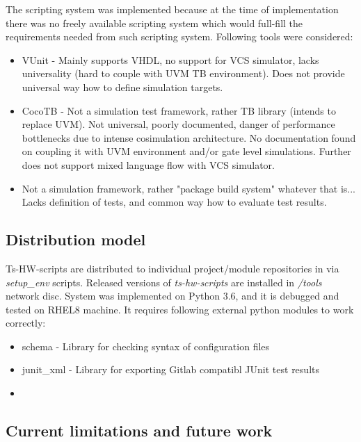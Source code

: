 \documentclass{tropic_design_spec}
\begin{document}
The scripting system was implemented because at the time of implementation there
was no freely available scripting system which would full-fill the requirements
needed from such scripting system. Following tools were considered:
\begin{itemize}
    \item{VUnit - Mainly supports VHDL, no support for VCS simulator, lacks
          universality (hard to couple with UVM TB environment). Does not
          provide universal way how to define simulation targets.}
    \item{CocoTB - Not a simulation test framework, rather TB library
          (intends to replace UVM). Not universal, poorly documented, danger
          of performance bottlenecks due to intense cosimulation architecture.
          No documentation found on coupling it with UVM environment and/or
          gate level simulations. Further does not support mixed language
          flow with VCS simulator.}
    \item{Not a simulation framework, rather "package build system" whatever
          that is... Lacks definition of tests, and common way how to evaluate
          test results.}

\end{itemize}


\subsection*{Distribution model}

Ts-HW-scripts are distributed to individual project/module repositories in
via \textit{setup_env} scripts. Released versions of \textit{ts-hw-scripts}
are installed in \textit{/tools} network disc. System was implemented on Python
3.6, and it is debugged and tested on RHEL8 machine. It requires following
external python modules to work correctly:
\begin{itemize}
    \item{schema - Library for checking syntax of configuration files}
    \item{junit_xml - Library for exporting Gitlab compatibl JUnit test results}
    \item{}
\end{itemize}


\subsection*{Current limitations and future work}
\end{document}
